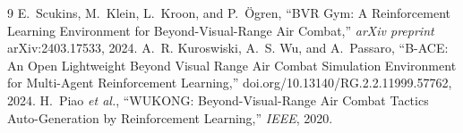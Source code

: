 \documentclass[11pt]{article}
\begin{document}
\begin{thebibliography}{9}
E.~Scukins, M.~Klein, L.~Kroon, and P.~\"Ogren, ``BVR Gym: A Reinforcement Learning Environment for Beyond-Visual-Range Air Combat,'' \emph{arXiv preprint} arXiv:2403.17533, 2024.
A.~R. Kuroswiski, A.~S. Wu, and A.~Passaro, ``B-ACE: An Open Lightweight Beyond Visual Range Air Combat Simulation Environment for Multi-Agent Reinforcement Learning,'' doi.org/10.13140/RG.2.2.11999.57762, 2024.
H.~Piao \emph{et al.}, ``WUKONG: Beyond-Visual-Range Air Combat Tactics Auto-Generation by Reinforcement Learning,'' \emph{IEEE}, 2020.
\end{thebibliography}
\end{document}
